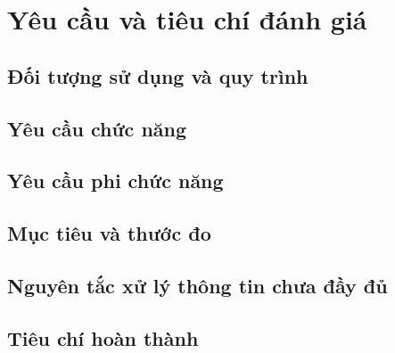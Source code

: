 \par{}
\section{Yêu cầu và tiêu chí đánh giá}\label{section:requirements-1}

\par{}
\subsection{Đối tượng sử dụng và quy trình}\label{subsection:requirements-2}

\par{}
\subsection{Yêu cầu chức năng}\label{subsection:requirements-3}

\par{}
\subsection{Yêu cầu phi chức năng}\label{subsection:requirements-4}

\par{}
\subsection{Mục tiêu và thước đo}\label{subsection:requirements-5}

\par{}
\subsection{Nguyên tắc xử lý thông tin chưa đầy đủ}\label{subsection:requirements-6}

\par{}
\subsection{Tiêu chí hoàn thành}\label{subsection:requirements-7}

